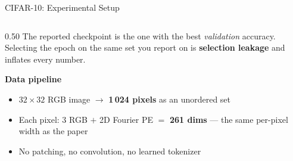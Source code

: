 \documentclass[aspectratio=169,11pt]{beamer}
\begin{document}
\begin{frame}[shrink=11]{CIFAR-10: Experimental Setup}
\begin{columns}[T]
\begin{column}{0.50\textwidth}
        \vspace{0.4em}
        The reported checkpoint is the one with the best \emph{validation} accuracy. Selecting the epoch on the same set you report on is \textbf{selection leakage} and inflates every number.
      

      \vspace{0.4em}
      \textbf{Data pipeline}
      \begin{itemize}
        \item $32\!\times\!32$ RGB image $\to$ \textbf{1\,024 pixels} as an unordered set
        \item Each pixel: 3 RGB $+$ 2D Fourier PE $= $ \textbf{261 dims} --- the same per-pixel width as the paper
        \item No patching, no convolution, no learned tokenizer
      \end{itemize}
    \end{column}
  \end{columns}
\end{frame}
\end{document}
